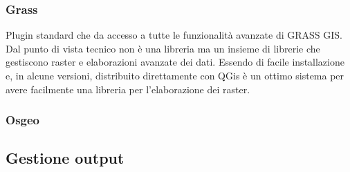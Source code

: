 \subsubsection{Grass}
Plugin standard che da accesso a tutte le funzionalità avanzate di GRASS GIS. Dal punto di vista tecnico non è una libreria ma un insieme di librerie che gestiscono raster e elaborazioni avanzate dei dati. Essendo di facile installazione e, in alcune versioni, distribuito direttamente con QGis è un ottimo sistema per avere facilmente una libreria per l'elaborazione dei raster.

\subsubsection{Osgeo}
\subsection{Gestione output}
